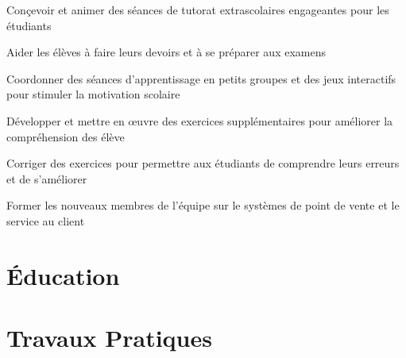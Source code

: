 \documentclass[letterpaper,10pt]{article}
\begin{document}
  \begin{resume_list}
    \item Conçevoir et animer des séances de tutorat extrascolaires engageantes pour les étudiants
    \item Aider les élèves à faire leurs devoirs et à se préparer aux examens
    \item Coordonner des séances d'apprentissage en petits groupes et des jeux interactifs pour stimuler la motivation scolaire
    \item Développer et mettre en œuvre des exercices supplémentaires pour améliorer la compréhension des élève
    \item Corriger des exercices pour permettre aux étudiants de comprendre leurs erreurs et de s'améliorer
  \end{resume_list}

  \begin{resume_list}
    \item Former les nouveaux membres de l'équipe sur le systèmes de point de vente et le service au client
  \end{resume_list}


  \section{Éducation}

  \vspace{10pt}
  \pagebreak


  \section{Travaux Pratiques}
\end{document}
